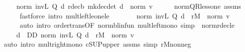 \begin{isabellebody}
\ \isamarkupfalse%
\ {\isachardoublequoteopen}{\isasymdots}\ {\isasymle}\ norm\ {\isacharparenleft}{\kern0pt}inv\isactrlsub L\ {\isacharparenleft}{\kern0pt}Q\ d{\isacharparenright}{\kern0pt}\ {\isacharparenleft}{\kern0pt}r{\isacharunderscore}{\kern0pt}dec\isactrlsub b\ {\isacharparenleft}{\kern0pt}mk{\isacharunderscore}{\kern0pt}dec{\isacharunderscore}{\kern0pt}det\ d{\isacharparenright}{\kern0pt}{\isacharparenright}{\kern0pt}{\isacharparenright}{\kern0pt}\ {\isacharplus}{\kern0pt}\ norm\ v{\isachardoublequoteclose}\isanewline
\ \ \ \ \isamarkupfalse%
\ norm{\isacharunderscore}{\kern0pt}QR{\isacharunderscore}{\kern0pt}less{\isacharunderscore}{\kern0pt}one\ assms\isanewline
\ \ \ \ \isamarkupfalse%
\ {\isacharparenleft}{\kern0pt}fastforce\ intro{\isacharbang}{\kern0pt}{\isacharcolon}{\kern0pt}\ mult{\isacharunderscore}{\kern0pt}left{\isacharunderscore}{\kern0pt}le{\isacharunderscore}{\kern0pt}one{\isacharunderscore}{\kern0pt}le{\isacharparenright}{\kern0pt}\isanewline
\ \ \isamarkupfalse%
\ \isamarkupfalse%
\ {\isachardoublequoteopen}{\isasymdots}\ {\isasymle}\ norm\ {\isacharparenleft}{\kern0pt}inv\isactrlsub L\ {\isacharparenleft}{\kern0pt}Q\ d{\isacharparenright}{\kern0pt}{\isacharparenright}{\kern0pt}\ {\isacharasterisk}{\kern0pt}\ r\isactrlsub M\ {\isacharplus}{\kern0pt}\ norm\ v{\isachardoublequoteclose}\isanewline
\ \ \ \ \isamarkupfalse%
\ {\isacharparenleft}{\kern0pt}auto\ intro{\isacharbang}{\kern0pt}{\isacharcolon}{\kern0pt}\ order{\isachardot}{\kern0pt}trans{\isacharbrackleft}{\kern0pt}OF\ norm{\isacharunderscore}{\kern0pt}blinfun{\isacharbrackright}{\kern0pt}\ mult{\isacharunderscore}{\kern0pt}left{\isacharunderscore}{\kern0pt}mono\ simp{\isacharcolon}{\kern0pt}\ \ norm{\isacharunderscore}{\kern0pt}r{\isacharunderscore}{\kern0pt}dec{\isacharunderscore}{\kern0pt}le{\isacharparenright}{\kern0pt}\isanewline
\ \ \isamarkupfalse%
\ \isamarkupfalse%
\ {\isachardoublequoteopen}{\isasymdots}\ {\isasymle}\ {\isacharparenleft}{\kern0pt}{\isasymSqunion}d\ {\isasymin}\ D\isactrlsub D{\isachardot}{\kern0pt}\ norm\ {\isacharparenleft}{\kern0pt}inv\isactrlsub L\ {\isacharparenleft}{\kern0pt}Q\ d{\isacharparenright}{\kern0pt}{\isacharparenright}{\kern0pt}{\isacharparenright}{\kern0pt}\ {\isacharasterisk}{\kern0pt}\ r\isactrlsub M\ {\isacharplus}{\kern0pt}\ norm\ v{\isachardoublequoteclose}\isanewline
\ \ \ \ \isamarkupfalse%
\ {\isacharparenleft}{\kern0pt}auto\ intro{\isacharbang}{\kern0pt}{\isacharcolon}{\kern0pt}\ mult{\isacharunderscore}{\kern0pt}right{\isacharunderscore}{\kern0pt}mono\ cSUP{\isacharunderscore}{\kern0pt}upper\ assms\ simp{\isacharcolon}{\kern0pt}\ r\isactrlsub M{\isacharunderscore}{\kern0pt}nonneg{\isacharparenright}{\kern0pt}\isanewline

\end{isabellebody}
